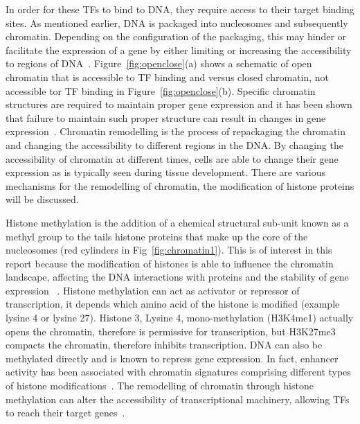         
        In order for these TFs to bind to DNA, they require access to their target binding sites. As mentioned earlier, DNA is packaged into nucleosomes and subsequently chromatin. Depending on the configuration of the packaging, this may hinder or facilitate the expression of a gene by either limiting or increasing the accessibility to regions of DNA~\cite{li2007role}. Figure~\ref{fig:openclose}(a) shows a schematic of open chromatin that is accessible to TF binding and versus closed chromatin, not accessible tor TF binding in Figure~\ref{fig:openclose}(b). Specific chromatin structures are required to maintain proper gene expression and it has been shown that failure to maintain such proper structure can result in changes in gene expression~\cite{ehrlich2001dna}. Chromatin remodelling is the process of repackaging the chromatin and changing the accessibility to different regions in the DNA. By changing the accessibility of chromatin at different times, cells are able to change their gene expression as is typically seen during tissue development. There are various mechanisms for the remodelling of chromatin, the modification of histone proteins will be discussed.%

        Histone methylation is the addition of a chemical structural sub-unit known as a methyl group to the tails histone proteins that make up the core of the nucleosomes (red cylinders in Fig~\ref{fig:chromatin1}). This is of interest in this report because the modification of histones is able to influence the chromatin landscape, affecting the DNA interactions with proteins and the stability of gene expression ~\cite{jaenisch2003epigenetic, whetstine2009histone}. Histone methylation can act as activator or repressor of transcription, it depends which amino acid of the histone is modified (example lysine 4 or lysine 27).
        Histone 3, Lysine 4, mono-methylation (H3K4me1) actually opens the chromatin, therefore is permissive for transcription, but H3K27me3 compacts the chromatin, therefore inhibits transcription.
        DNA can also be methylated directly and is known to repress gene expression.
        In fact, enhancer activity has been associated with chromatin signatures comprising different types of histone modifications~\cite{heintzman2007distinct, creyghton2010histone, rada2011unique}.%
        The remodelling of chromatin through histone methylation can alter the accessibility of transcriptional machinery, allowing TFs to reach their target genes~\cite{gibney2010epigenetics, holoch2015rna}. 


